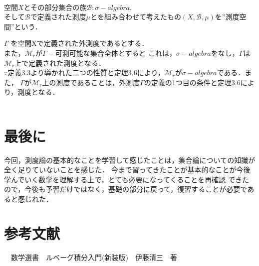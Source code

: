 \documentclass[11pt, a4paper, dvipdfmx]{jsarticle}
\theoremstyle{definition}
\begin{document}
\\
空間$X$とその部分集合の族$\mathcal{B}:\sigma-algebra$,\\
そして$\mathcal{B}$で定義された測度$\mu$とを組み合わせて考えたもの$(X,\mathcal{B},\mu)$を”測度空間”という．

\Theorem
$\Gamma$ を空間Xで定義された外測度であるとする．\\また，$\mathcal{M}_r$が$\Gamma-$可測可能な集合全体とすると
これは，$\sigma-algebra$をなし，$\Gamma$は$\mathcal{M}_r$上で定義された測度となる．\\
$\because $定義3.3より導かれた二つの性質と定理3.6により，$\mathcal{M}_r$が$\sigma-algebra$である．また，
$\Gamma$が$\mathcal{M}_r$上の測度であることは，外測度$\Gamma$の定義の1つ目の条件と定理3.6により，測度となる．\\
\\
\section{最後に}
 今回，測度論の基本的なことを学習して感じたことは，集合論についての知識が全く足りていないことを感じた．
 今まで習ってきたことが基本的なことが今後学んでいく数学を理解する上で，とても必要になってくることを再確認
 できたので，今後も予習だけではなく，基礎の部分に戻って，復習することが必要であると感じれた．

\section{参考文献}
　数学選書　ルベーグ積分入門(新装版)　伊藤清三　著
\end{document}
